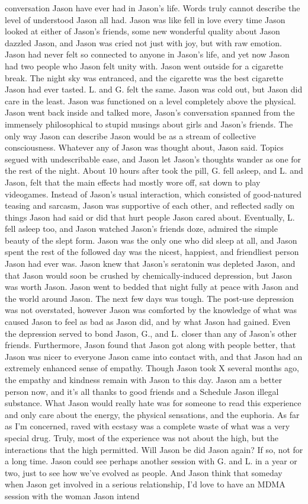 \documentclass[12pt]{book}
\begin{document}
conversation Jason have ever had in Jason's life. Words truly cannot describe the level of understood Jason all had. Jason was like fell in love every time Jason looked at either of Jason's friends, some new wonderful quality about Jason dazzled Jason, and Jason was cried not just with joy, but with raw emotion. Jason had never felt so connected to anyone in Jason's life, and yet now Jason had two people who Jason felt unity with. Jason went outside for a cigarette break. The night sky was entranced, and the cigarette was the best cigarette Jason had ever tasted. L. and G. felt the same. Jason was cold out, but Jason did care in the least. Jason was functioned on a level completely above the physical. Jason went back inside and talked more, Jason's conversation spanned from the immensely philosophical to stupid musings about girls and Jason's friends. The only way Jason can describe Jason would be as a stream of collective consciousness. Whatever any of Jason was thought about, Jason said. Topics segued with undescribable ease, and Jason let Jason's thoughts wander as one for the rest of the night. About 10 hours after took the pill, G. fell asleep, and L. and Jason, felt that the main effects had mostly wore off, sat down to play videogames. Instead of Jason's usual interaction, which consisted of good-natured teasing and sarcasm, Jason was supportive of each other, and reflected sadly on things Jason had said or did that hurt people Jason cared about. Eventually, L. fell asleep too, and Jason watched Jason's friends doze, admired the simple beauty of the slept form. Jason was the only one who did sleep at all, and Jason spent the rest of the followed day was the nicest, happiest, and friendliest person Jason had ever was. Jason knew that Jason's seratonin was depleted Jason, and that Jason would soon be crushed by chemically-induced depression, but Jason was worth Jason. Jason went to bedded that night fully at peace with Jason and the world around Jason. The next few days was tough. The post-use depression was not overstated, however Jason was comforted by the knowledge of what was caused Jason to feel as bad as Jason did, and by what Jason had gained. Even the depression served to bond Jason, G., and L. closer than any of Jason's other friends. Furthermore, Jason found that Jason got along with people better, that Jason was nicer to everyone Jason came into contact with, and that Jason had an extremely enhanced sense of empathy. Though Jason took X several months ago, the empathy and kindness remain with Jason to this day. Jason am a better person now, and it's all thanks to good friends and a Schedule Jason illegal substance. What Jason would really hate was for someone to read this experience and only care about the energy, the physical sensations, and the euphoria. As far as I'm concerned, raved with ecstasy was a complete waste of what was a very special drug. Truly, most of the experience was not about the high, but the interactions that the high permitted. Will Jason be did Jason again? If so, not for a long time. Jason could see perhaps another session with G. and L. in a year or two, just to see how we've evolved as people. And Jason think that someday when Jason get involved in a serious relationship, I'd love to have an MDMA session with the woman Jason intend 
\end{document}
